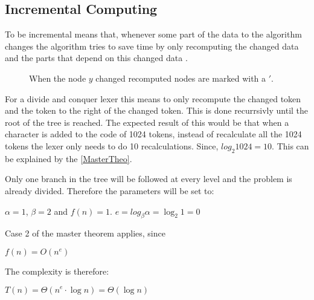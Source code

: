 \subsection{Incremental Computing}
To be incremental means that, whenever some part of the data to the algorithm
changes the algorithm tries to save time by only recomputing the changed data
and the parts that depend on this changed data \cite{incrementalDef}.

\begin{figure}[!htp]
\centering
\caption{When the node $y$ changed recomputed nodes are marked with a $'$. \label{fig:incUp}}
\end{figure}

For a divide and conquer lexer this means to only recompute the changed token
and the token to the right of the changed token. This is done recurrsivly until
the root of the tree is reached. The expected result of this would be that when
a character is added to the code of 1024 tokens, instead of recalculate all the 
1024 tokens the lexer only needs to do 10 recalculations. Since,
$log_2 1024 = 10$. This can be explained by the \cref{MasterTheo}.

Only one branch in the tree will be followed at every level and the problem is
already divided. Therefore the parameters will be set to:
\begin{center}
$\alpha = 1$, $\beta = 2$ and $f(n) = 1$.
$e=log_\beta\alpha=\log_2 1=0$
\end{center}
Case 2 of the master theorem applies, since
\begin{center}
$f(n) = O(n^e)$
\end{center}
The complexity is therefore:
\begin{center}
$T(n) = \Theta(n^e \cdot \log n) = \Theta(\log n)$
\end{center}

